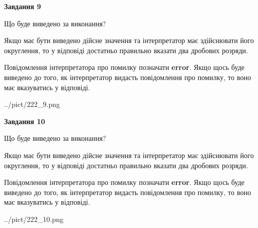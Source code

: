 \documentclass[12pt, ukrainian]{article}
\begin{document}
{\begin {Large}
{\begin {center}\textbf{Завдання 9}\end {center}}\par
Що буде виведено за виконання? \par

Якщо має бути виведено дійсне значення та інтерпретатор має здійснювати його округлення, 
то у відповіді достатньо правильно вказати два дробових розряди.

Повідомлення інтерпретатора про помилку позначати \textbf{error}.
Якщо щось буде виведено до того, як інтерпретатор видасть повідомлення про помилку, 
то воно має вказуватись у відповіді. \par

\begin{center}
	{../pict/222_9.png}
\end{center}
\newpage

{\begin {center}\textbf{Завдання 10}\end {center}}\par
Що буде виведено за виконання? \par

Якщо має бути виведено дійсне значення та інтерпретатор має здійснювати його округлення, 
то у відповіді достатньо правильно вказати два дробових розряди.

Повідомлення інтерпретатора про помилку позначати \textbf{error}.
Якщо щось буде виведено до того, як інтерпретатор видасть повідомлення про помилку, 
то воно має вказуватись у відповіді. \par

\begin{center}
	{../pict/222_10.png}
\end{center}
\newpage

\end {Large}}
\end{document}
